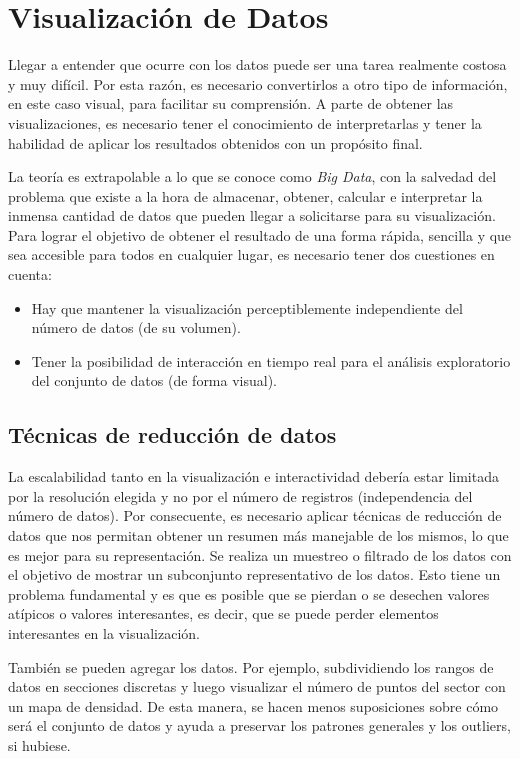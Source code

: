 \section{Visualización de Datos}

Llegar a entender que ocurre con los datos puede ser una tarea realmente costosa y muy difícil. Por esta razón, es necesario convertirlos a otro tipo de información, en este caso visual, para facilitar su comprensión. A parte de obtener las visualizaciones, es necesario tener el conocimiento de interpretarlas y tener la habilidad de aplicar los resultados obtenidos con un propósito final. 

La teoría es extrapolable a lo que se conoce como \textit{Big Data}, con la salvedad del problema que existe a la hora de almacenar, obtener, calcular e interpretar la inmensa cantidad de datos que pueden llegar a solicitarse para su visualización. Para lograr el objetivo de obtener el resultado de una forma rápida, sencilla y que sea accesible para todos en cualquier lugar, es necesario tener dos cuestiones en cuenta:
\begin{itemize}
	\item Hay que mantener la visualización perceptiblemente independiente del número de datos (de su volumen).
	\item Tener la posibilidad de interacción en tiempo real para el análisis exploratorio del conjunto de datos (de forma visual).
\end{itemize}

\subsection{Técnicas de reducción de datos}
La escalabilidad tanto en la visualización e interactividad debería estar limitada por la resolución elegida y no por el número de registros (independencia del número de datos). Por consecuente, es necesario aplicar técnicas de reducción de datos que nos permitan obtener un resumen más manejable de los mismos, lo que es mejor para su representación. Se realiza un muestreo o filtrado de los datos con el objetivo de mostrar un subconjunto representativo de los datos. Esto tiene un problema fundamental y es que es posible que se pierdan o se desechen valores atípicos o valores interesantes, es decir, que se puede perder elementos interesantes en la visualización.

También se pueden agregar los datos. Por ejemplo, subdividiendo los rangos de datos en secciones discretas y luego visualizar el número de puntos del sector con un mapa de densidad. De esta manera, se hacen menos suposiciones sobre cómo será el conjunto de datos y ayuda a preservar los patrones generales y los outliers, si hubiese.

